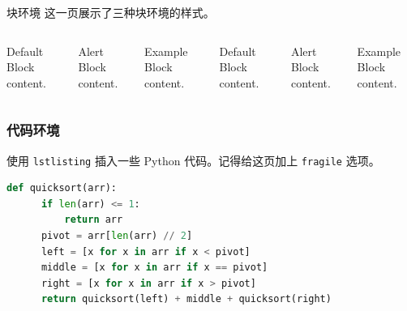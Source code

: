 \documentclass[aspectratio=169]{ctexbeamer}
\begin{document}
\begin{frame}{块环境}
  这一页展示了三种块环境的样式。
  \begin{columns}[T,onlytextwidth]
      \begin{block}{Default}
        Block content.
      \end{block}

      \begin{alertblock}{Alert}
        Block content.
      \end{alertblock}

      \begin{exampleblock}{Example}
        Block content.
      \end{exampleblock}


      \begin{block}{Default}
        Block content.
      \end{block}

      \begin{alertblock}{Alert}
        Block content.
      \end{alertblock}

      \begin{exampleblock}{Example}
        Block content.
      \end{exampleblock}

  \end{columns}
\end{frame}

\begin{frame}[fragile]
  \frametitle{代码环境}
  使用 \texttt{lstlisting} 插入一些 Python 代码。记得给这页加上 \texttt{fragile} 选项。

  \begin{lstlisting}[language=Python,basicstyle=\small]
  def quicksort(arr):
      if len(arr) <= 1:
          return arr
      pivot = arr[len(arr) // 2]
      left = [x for x in arr if x < pivot]
      middle = [x for x in arr if x == pivot]
      right = [x for x in arr if x > pivot]
      return quicksort(left) + middle + quicksort(right)
  \end{lstlisting}
\end{frame}
\end{document}
